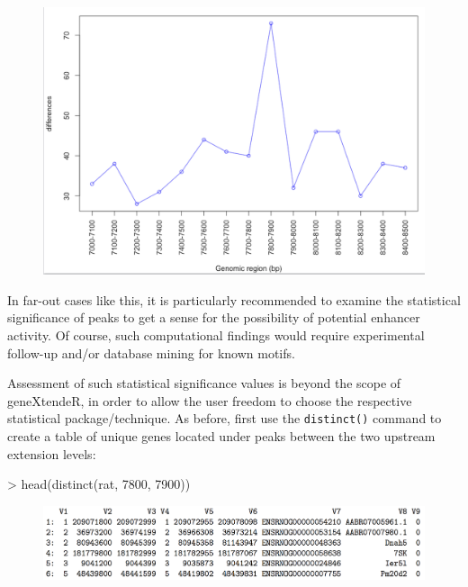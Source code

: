 \documentclass[12pt]{article}
\begin{document}
\begin{figure}[H]
\centering
\includegraphics{figures/fig4.png}
\end{figure}

In far-out cases like this, it is particularly recommended to examine the statistical significance of peaks to get a sense for the possibility of potential enhancer activity.  Of course, such computational findings would require experimental follow-up and/or database mining for known motifs.  

Assessment of such statistical significance values is beyond the scope of geneXtendeR, in order to allow the user freedom to choose the respective statistical package/technique.  As before, first use the \texttt{distinct()} command to create a table of unique genes located under peaks between the two upstream extension levels:

\begin{Schunk}
\begin{Sinput}
> head(distinct(rat, 7800, 7900))
\end{Sinput}
\end{Schunk}

\begin{figure}[H]
\centering
\includegraphics{figures/table2.png}
\end{figure}
\end{document}

